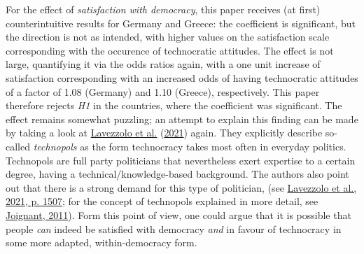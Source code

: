 \documentclass[
  12pt,
  english,
]{article}
\begin{document}
For the effect of \emph{satisfaction with democracy}, this paper
receives (at first) counterintuitive results for Germany and Greece: the
coefficient is significant, but the direction is not as intended, with
higher values on the satisfaction scale corresponding with the occurence
of technocratic attitudes. The effect is not large, quantifying it via
the odds ratios again, with a one unit increase of satisfaction
corresponding with an increased odds of having technocratic attitudes of
a factor of 1.08 (Germany) and 1.10 (Greece), respectively. This paper
therefore rejects \emph{H1} in the countries, where the coefficient was
significant. The effect remains somewhat puzzling; an attempt to explain
this finding can be made by taking a look at
\protect\hyperlink{ref-lavezzolo2021will}{Lavezzolo et al.}
(\protect\hyperlink{ref-lavezzolo2021will}{2021}) again. They explicitly
describe so-called \emph{technopols} as the form technocracy takes most
often in everyday politics. Technopols are full party politicians that
nevertheless exert expertise to a certain degree, having a
technical/knowledge-based background. The authors also point out that
there is a strong demand for this type of politician, (see
\protect\hyperlink{ref-lavezzolo2021will}{Lavezzolo et al., 2021, p.
1507}; for the concept of technopols explained in more detail, see
\protect\hyperlink{ref-joignant2011technopols}{Joignant, 2011}). Form
this point of view, one could argue that it is possible that people
\emph{can} indeed be satisfied with democracy \emph{and} in favour of
technocracy in some more adapted, within-democracy form.
\end{document}
